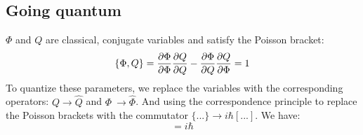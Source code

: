 \subsection{Going quantum}
$\Phi$ and $Q$ are classical, conjugate variables and satisfy the Poisson bracket:
\begin{equation}
    \{ \Phi, Q\} = \frac{\partial \Phi}{\partial \Phi}\frac{\partial Q}{\partial Q} - \frac{\partial \Phi}{\partial Q}\frac{\partial Q}{\partial \Phi} = 1
\end{equation}
To quantize these parameters, we replace the variables with the corresponding operators: $Q \to \hat{Q}$ and $\Phi \ \to \hat{\Phi}$. And using the correspondence principle to replace the Poisson brackets with the commutator $\{...\} \to i\hbar[...]$. We have:
\begin{equation}
    [\hat{\Phi}, \hat{Q}] = i\hbar
\end{equation}




